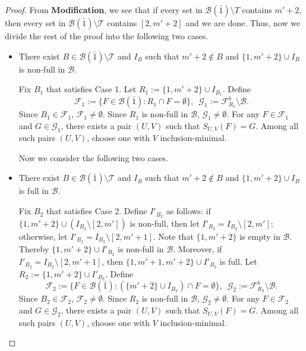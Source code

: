 \documentclass[11pt]{article}
\newcommand{\m}{\mathcal}
\begin{document}
\begin{proof}
From {\bf Modification}, we see that if every set in $\m B(\bar 1)\setminus T$ contains $m'+2$, then every set in $\m B(\bar 1)\setminus \m T$ contains $[2,m'+2]$ and we are done. Thus, now we divide the rest of the proof into the following two cases.

\begin{itemize}
\item[Case 1.] There exist $B\in \m B(\bar{1})\setminus \m T$ and $I_B$ such that $m'+2\not\in B $ and  $\{1,m'+2\}\cup I_B$ is non-full in $\m B$. 

Fix $B_1$ that satisfies Case 1. 
Let $R_1:=\{1,m'+2\}\cup I_{B_1}$.
Define 
\begin{equation*}
    \m F_1:=\{F\in \m B(\bar1): R_1\cap F=\emptyset\}, \,\,\,
    \m G_1:=\m F_{R_1}^b\setminus \m B.
\end{equation*}
Since $B_1\in \m F_1$, $\m F_1\ne \emptyset$.
Since $R_1$ is non-full in $\m B$, $\m G_1\ne \emptyset$. 
For any $F\in \m F_1$ and $G\in \m G_1$, there exists a pair $(U,V)$ such that $S_{U,V}(F)=G$. Among all such pairs $(U,V)$, choose one with $V$ inclusion-minimal. 

Now we consider the following two cases.


\item[Case 2.] 
There exist $B\in \m B(\bar{1})\setminus \m T$ and $I_B$ such that $m'+2\not\in B $ and $\{1,m'+2\}\cup I_B$ is full in $\m B$. 

Fix $B_2$ that satisfies Case 2.
Define $I'_{B_2}$ as follows: 
if $\{1,m'+2\}\cup (I_{B_2}\setminus [2,m'])$ is non-full, then 
let $I'_{B_2}=I_{B_2}\setminus [2,m']$; otherwise, let $I'_{B_2}=I_{B_2}\setminus [2,m'+1]$. 
Note that $\{1,m'+2\}$ is empty in $\m B$. Thereby $\{1,m'+2\}\cup I'_{B_2}$ is non-full in $\m B$. Moreover, if $I'_{B_2}=I_{B_2}\setminus [2,m'+1]$, then $\{1,m'+1,m'+2\}\cup I'_{B_2}$ is full. 
Let $R_2:=\{1, m'+2\}\cup I'_{B_2}$.
Define 
\begin{equation*}
    \m F_2:=\{F\in \m B(\bar1): (\{m'+2\}\cup I_{B_2})\cap F=\emptyset\}, \,\,\,
    \m G_2:=\m F_{R_2}^b\setminus \m B.
\end{equation*}
Since $B_2\in \m F_2$, $\m F_2\ne \emptyset$. Since $R_2$ is non-full in $\m B$, $\m G_2\ne \emptyset$. 
For any $F\in \m F_2$ and $G\in \m G_2$, there exists a pair $(U,V)$ such that $S_{U,V}(F)=G$. Among all such pairs $(U,V)$, choose one with $V$ inclusion-minimal. 
\end{itemize}


\end{proof}
\end{document}
